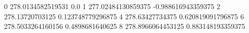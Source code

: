 0 278.0134582519531 0.0
1 277.02484130859375 -0.988616943359375
2 278.13720703125 0.123748779296875
4 278.63427734375 0.620819091796875
6 278.5033264160156 0.4898681640625
8 278.8966064453125 0.883148193359375
